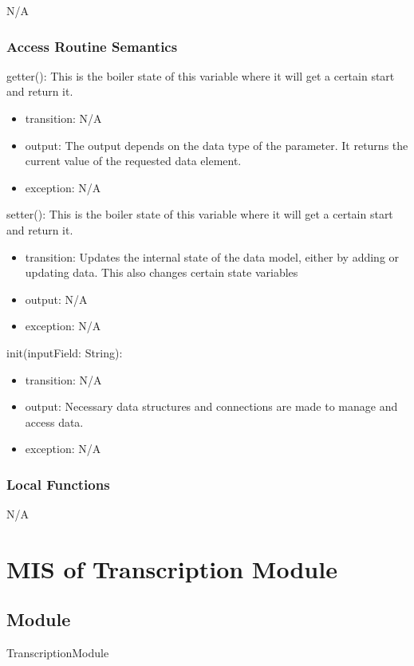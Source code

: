 \documentclass[12pt, titlepage]{article}
\begin{document}
N/A

\subsubsection{Access Routine Semantics}

\noindent getter(): This is the boiler state of this variable where it will get a certain start and return it.
\begin{itemize}
    \item transition: N/A
    \item output: The output depends on the data type of the parameter. It returns the current value of the requested data element.
    \item exception: N/A
\end{itemize}

\noindent setter(): This is the boiler state of this variable where it will get a certain start and return it.
\begin{itemize}
    \item transition: Updates the internal state of the data model, either by adding or updating data. This also changes certain state variables
    \item output: N/A
    \item exception: N/A
\end{itemize}

\noindent init(inputField: String):
\begin{itemize}
\item transition: N/A
\item output: Necessary data structures and connections are made to manage and access data.
\item exception: N/A
\end{itemize}

\subsubsection{Local Functions}

N/A

\newpage

  
\section{MIS of Transcription Module} \label{Transcription_Module}

\subsection{Module}
TranscriptionModule
\end{document}

